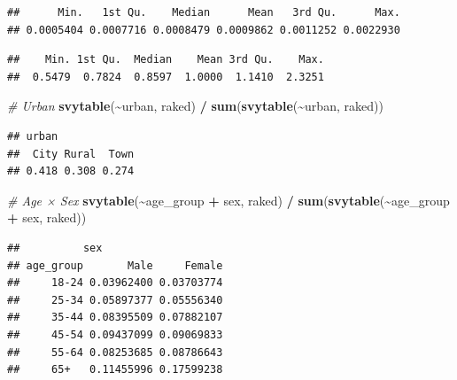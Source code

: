 \documentclass[
]{article}
\newenvironment{Shaded}{\begin{snugshade}}{\end{snugshade}}
\newcommand{\CommentTok}[1]{\textcolor[rgb]{0.56,0.35,0.01}{\textit{#1}}}
\newcommand{\FunctionTok}[1]{\textcolor[rgb]{0.13,0.29,0.53}{\textbf{#1}}}
\newcommand{\NormalTok}[1]{#1}
\newcommand{\OtherTok}[1]{\textcolor[rgb]{0.56,0.35,0.01}{#1}}
\newcommand{\SpecialCharTok}[1]{\textcolor[rgb]{0.81,0.36,0.00}{\textbf{#1}}}
\begin{document}
\begin{verbatim}
##      Min.   1st Qu.    Median      Mean   3rd Qu.      Max. 
## 0.0005404 0.0007716 0.0008479 0.0009862 0.0011252 0.0022930
\end{verbatim}

\begin{Shaded}
\end{Shaded}

\begin{verbatim}
##    Min. 1st Qu.  Median    Mean 3rd Qu.    Max. 
##  0.5479  0.7824  0.8597  1.0000  1.1410  2.3251
\end{verbatim}

\begin{Shaded}
\begin{Highlighting}[]
\CommentTok{\# Urban}
\FunctionTok{svytable}\NormalTok{(}\SpecialCharTok{\textasciitilde{}}\NormalTok{urban, raked) }\SpecialCharTok{/} \FunctionTok{sum}\NormalTok{(}\FunctionTok{svytable}\NormalTok{(}\SpecialCharTok{\textasciitilde{}}\NormalTok{urban, raked))}
\end{Highlighting}
\end{Shaded}

\begin{verbatim}
## urban
##  City Rural  Town 
## 0.418 0.308 0.274
\end{verbatim}

\begin{Shaded}
\begin{Highlighting}[]
\CommentTok{\# Age × Sex}
\FunctionTok{svytable}\NormalTok{(}\SpecialCharTok{\textasciitilde{}}\NormalTok{age\_group }\SpecialCharTok{+}\NormalTok{ sex, raked) }\SpecialCharTok{/} \FunctionTok{sum}\NormalTok{(}\FunctionTok{svytable}\NormalTok{(}\SpecialCharTok{\textasciitilde{}}\NormalTok{age\_group }\SpecialCharTok{+}\NormalTok{ sex, raked))}
\end{Highlighting}
\end{Shaded}

\begin{verbatim}
##          sex
## age_group       Male     Female
##     18-24 0.03962400 0.03703774
##     25-34 0.05897377 0.05556340
##     35-44 0.08395509 0.07882107
##     45-54 0.09437099 0.09069833
##     55-64 0.08253685 0.08786643
##     65+   0.11455996 0.17599238
\end{verbatim}
\end{document}
